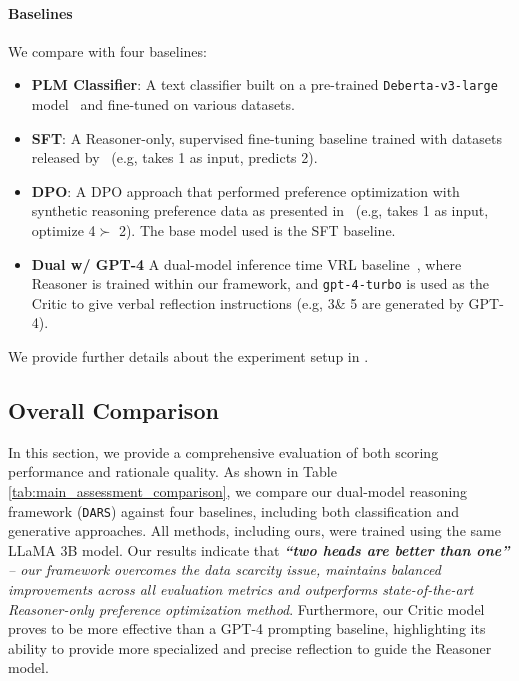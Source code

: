 \paragraph{Baselines}
We compare with four baselines: 
\begin{itemize}[leftmargin=*,noitemsep,topsep=0pt,label={}]
\item \textbf{PLM Classifier}: A text classifier built on a pre-trained \texttt{Deberta-v3-large} model~\cite{debertav3} and fine-tuned on various datasets.
\item \textbf{SFT}: A Reasoner-only, supervised fine-tuning baseline trained with datasets released by~\citep{li_emnlp2024} (e.g, takes \textcircled{\raisebox{-0.3pt} {\scriptsize1}} as input, predicts \textcircled{\raisebox{-0.3pt} {\scriptsize2}}).
\item \textbf{DPO}: A DPO approach that performed preference optimization with synthetic reasoning preference data as presented in~\citep{li_emnlp2024} (e.g, takes \textcircled{\raisebox{-0.3pt} {\scriptsize1}} as input, optimize \textcircled{\raisebox{-0.3pt} {\scriptsize4}}$\succ$\textcircled{\raisebox{-0.3pt} {\scriptsize2}}). The base model used is the SFT baseline. 
\item \textbf{Dual w/ GPT-4} A dual-model inference time VRL baseline~\cite{dong-etal-2024-pace}, where Reasoner is trained within our framework, and \texttt{gpt-4-turbo} is used as the Critic to give verbal reflection instructions (e.g,  \textcircled{\raisebox{-0.3pt} {\scriptsize3}}\&\textcircled{\raisebox{-0.3pt} {\scriptsize5}} are generated by GPT-4).
\end{itemize}
We provide further details about the experiment setup in \textsection{\ref{sec:further_experiment_setup}}.

\subsection{Overall Comparison} \label{sec:main_exps}
In this section, we provide a comprehensive evaluation of both scoring performance and rationale quality. As shown in Table \ref{tab:main_assessment_comparison}, we compare our dual-model reasoning framework (\texttt{DARS}) against four baselines, including both classification and generative approaches. All methods, including ours, were trained using the same LLaMA 3B model. Our results indicate that \emph{\textbf{``two heads are better than one''} -- our framework overcomes the data scarcity issue, maintains balanced improvements across all evaluation metrics and outperforms state-of-the-art Reasoner-only preference optimization method}. Furthermore, our Critic model proves to be more effective than a GPT-4 prompting baseline, highlighting its ability to provide more specialized and precise reflection to guide the Reasoner model.

